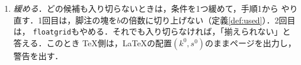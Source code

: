 \documentclass[paper=a4,fontsize=10pt]{jlreq}
\newcommand\opt[1]{\texttt{#1}}
\newcommand\kyocho[1]{{\gtfamily\itshape #1}}
\newenvironment{tejun}{%
  \par\noindent{\gtfamily\sffamily 手順}\hspace{1\zw}\ignorespaces}
  {\par\addvspace{.5\baselineskip}}
\begin{document}
\begin{tejun}
\begin{enumerate}
\begin{enumerate}
        フロートを箱の下端に付ける．
      \item 下のフロートのある段で，段のグルーの伸びの和が不足$\beta-v_i$に足りない
        とき：本文と下のフロートの間（フロートを箱の下端に付ける）．
      \item 段$L$と，次の段に中身のある途中の段で，不足$\beta-v_i$が半行（$b/2$）を
        超えるとき：本文の末尾（行を動かさずに下を空ける）．
    \end{enumerate}
    ほかのグルーは，\TeX{}が箱の高さに合わせて伸び縮みさせる．配置と$\beta$を返す
    （実装は，$\beta$を揃えた段組の高さとして使う）．
  \item \kyocho{緩める}．どの候補も入り切らないときは，条件を1つ緩めて，手順1から
    やり直す．1回目は，脚注の塊を$b$の倍数に切り上げない（定義\ref{def:used}）．2回目は，
    \opt{floatgrid}もやめる．それでも入り切らなければ，「揃えられない」と答える．このとき
    \TeX{}側は，\LaTeX{}の配置$(k^0,s^0)$のままページを出力し，警告を出す．
\end{enumerate}
\end{tejun}
\end{document}
